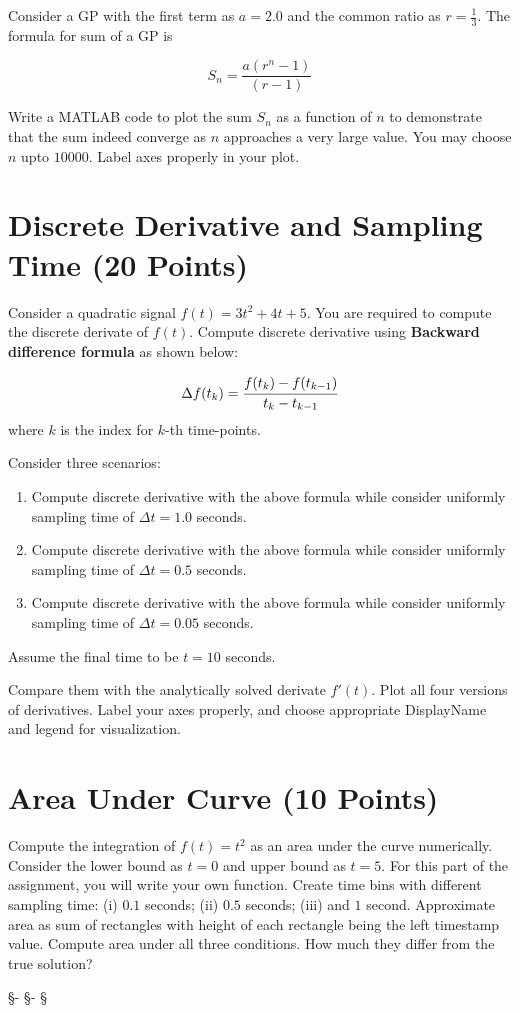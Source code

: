 \documentclass[12pt, xcolor=dvipsnames,svgnames,x11names]{article}
\begin{document}
Consider a GP with the first term as $a = 2.0$ and the common ratio as $r=\frac{1}{3}$. The formula for sum of a GP is 

$$
S_n = \frac{a(r^n - 1)}{(r - 1)}
$$

Write a MATLAB code to plot the sum $S_n$ as a function of $n$ to demonstrate that the sum indeed converge as $n$ approaches a very large value. You may choose $n$ upto $10000$. Label axes properly in your plot.

\section{Discrete Derivative and Sampling Time (20 Points)}

Consider a quadratic signal $f(t) = 3t^2 + 4t + 5$. You are required to compute the discrete derivate of $f(t)$. Compute discrete derivative using \textbf{Backward difference formula} as shown below:

$$
\Delta f(t_k) = \cfrac{f(t_k) - f(t_{k-1}) }{t_k - t_{k-1}}
$$
where $k$ is the index for $k$-th time-points. 

Consider three scenarios:

\begin{enumerate}
   \item Compute discrete derivative with the above formula while consider uniformly sampling time of $\Delta t  = 1.0$ seconds.
   \item Compute discrete derivative with the above formula while consider uniformly sampling time of $\Delta t  = 0.5$ seconds.
   \item Compute discrete derivative with the above formula while consider uniformly sampling time of $\Delta t  = 0.05$ seconds.
\end{enumerate}

Assume the final time to be $t = 10$ seconds.

Compare them with the analytically solved derivate $f'(t)$. Plot all four versions of derivatives. Label your axes properly, and choose appropriate DisplayName and legend for visualization.

\section{Area Under Curve (10 Points)}

Compute the integration of $f(t) = t^2$ as an area under the curve numerically. Consider the lower bound as $t = 0$ and upper bound as $t = 5$. For this part of the assignment, you will write your own function. Create time bins with different sampling time: (i) $0.1$ seconds; (ii) $0.5$ seconds; (iii) and $1$ second. Approximate area as sum of rectangles with height of each rectangle being the left timestamp value. Compute area under all three conditions. How much they differ from the true solution?


\begin{center}
   \S - \S - \S
\end{center}
\end{document}

